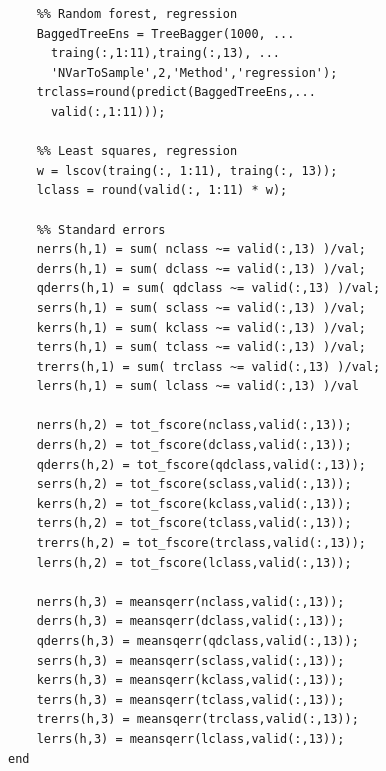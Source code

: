 \documentclass[twoside]{article}
\begin{document}
\begin{multicols}{2}
{\begin{verbatim}
    %% Random forest, regression
    BaggedTreeEns = TreeBagger(1000, ...
      traing(:,1:11),traing(:,13), ...
      'NVarToSample',2,'Method','regression');    
    trclass=round(predict(BaggedTreeEns,...
      valid(:,1:11)));
        
    %% Least squares, regression
    w = lscov(traing(:, 1:11), traing(:, 13));
    lclass = round(valid(:, 1:11) * w);

    %% Standard errors
    nerrs(h,1) = sum( nclass ~= valid(:,13) )/val;
    derrs(h,1) = sum( dclass ~= valid(:,13) )/val;
    qderrs(h,1) = sum( qdclass ~= valid(:,13) )/val;
    serrs(h,1) = sum( sclass ~= valid(:,13) )/val;
    kerrs(h,1) = sum( kclass ~= valid(:,13) )/val;
    terrs(h,1) = sum( tclass ~= valid(:,13) )/val;
    trerrs(h,1) = sum( trclass ~= valid(:,13) )/val;
    lerrs(h,1) = sum( lclass ~= valid(:,13) )/val

    nerrs(h,2) = tot_fscore(nclass,valid(:,13));
    derrs(h,2) = tot_fscore(dclass,valid(:,13));
    qderrs(h,2) = tot_fscore(qdclass,valid(:,13));
    serrs(h,2) = tot_fscore(sclass,valid(:,13));
    kerrs(h,2) = tot_fscore(kclass,valid(:,13));
    terrs(h,2) = tot_fscore(tclass,valid(:,13));
    trerrs(h,2) = tot_fscore(trclass,valid(:,13));
    lerrs(h,2) = tot_fscore(lclass,valid(:,13));

    nerrs(h,3) = meansqerr(nclass,valid(:,13));
    derrs(h,3) = meansqerr(dclass,valid(:,13));
    qderrs(h,3) = meansqerr(qdclass,valid(:,13));
    serrs(h,3) = meansqerr(sclass,valid(:,13));
    kerrs(h,3) = meansqerr(kclass,valid(:,13));
    terrs(h,3) = meansqerr(tclass,valid(:,13));
    trerrs(h,3) = meansqerr(trclass,valid(:,13));
    lerrs(h,3) = meansqerr(lclass,valid(:,13));
end

\end{verbatim}

}

\end{multicols}
\end{document}

